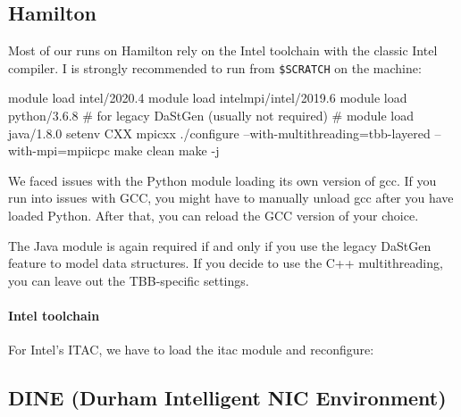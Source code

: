 \subsection{Hamilton}

Most of our runs on Hamilton rely on the Intel toolchain with the classic Intel
compiler.
I is strongly recommended to run from \texttt{\$SCRATCH} on the machine:


\begin{code}
module load intel/2020.4
module load intelmpi/intel/2019.6
module load python/3.6.8
# for legacy DaStGen (usually not required)
# module load java/1.8.0
setenv CXX mpicxx
./configure --with-multithreading=tbb-layered --with-mpi=mpiicpc
make clean
make -j
\end{code}





\begin{remark}
 We faced issues with the Python module loading its own version of gcc.
 If you run into issues with GCC, you might have to manually unload gcc after
 you have loaded Python. After that, you can reload the GCC version of your
 choice.
\end{remark}

\noindent
The Java module is again required if and only if you use the legacy DaStGen
feature to model data structures.
If you decide to use the C++ multithreading, you can leave out the TBB-specific
settings.



\paragraph{Intel toolchain}

For Intel's ITAC, we have to load the itac module and reconfigure:



\subsection{DINE (Durham Intelligent NIC Environment)}


